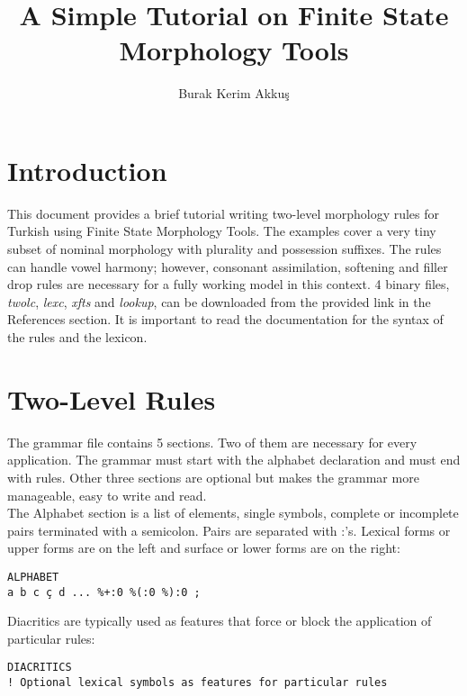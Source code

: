 \documentclass[11pt,a4paper]{article}
\begin{document}
\title{A Simple Tutorial on Finite State Morphology Tools}

\author{Burak Kerim Akkuş}

\date{}

\maketitle

\section{Introduction}
This document provides a brief tutorial writing two-level morphology rules for Turkish using Finite State Morphology Tools. The examples cover a very tiny subset of nominal morphology with plurality and possession suffixes. The rules can handle vowel harmony; however, consonant assimilation, softening and filler drop rules are necessary for a fully working model in this context.
4 binary files, \textit{twolc}, \textit{lexc}, \textit{xfts} and \textit{lookup}, can be downloaded from the provided link in the References section. It is important to read the documentation for the syntax of the rules and the lexicon. 


\section{Two-Level Rules}

The grammar file contains 5 sections. Two of them are necessary for every application. The grammar must start with the alphabet declaration and must end with rules. Other three sections are optional but makes the grammar more manageable, easy to write and read.\\


The Alphabet section is a list of elements, single symbols, complete or incomplete pairs terminated with a semicolon. Pairs are separated with :'s. Lexical forms or upper forms are on the left and surface or lower forms are on the right: \\
\begin{lstlisting}[belowskip=1em,frame=single]
ALPHABET
a b c ç d ... %+:0 %(:0 %):0 ;

\end{lstlisting}

Diacritics are typically used as features that force or block the application of particular rules:\\
\begin{lstlisting}[belowskip=1em,frame=single]
DIACRITICS
! Optional lexical symbols as features for particular rules

\end{lstlisting}
\end{document}

